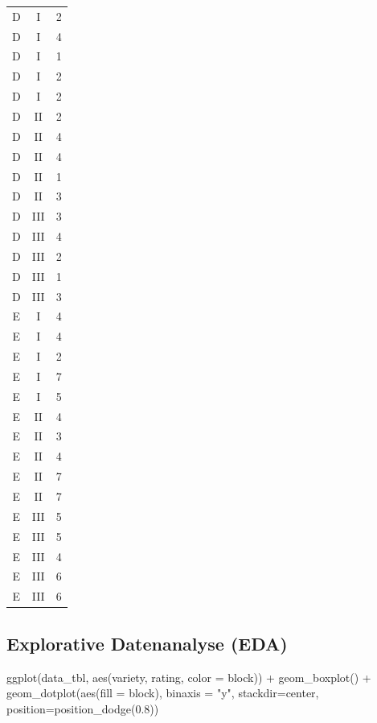 \documentclass[
  letterpaper,
  DIV=11,
  oneside]{scrreport}
\newenvironment{Shaded}{\begin{snugshade}}{\end{snugshade}}
\newcommand{\AttributeTok}[1]{\textcolor[rgb]{0.40,0.45,0.13}{#1}}
\newcommand{\FloatTok}[1]{\textcolor[rgb]{0.68,0.00,0.00}{#1}}
\newcommand{\FunctionTok}[1]{\textcolor[rgb]{0.28,0.35,0.67}{#1}}
\newcommand{\NormalTok}[1]{\textcolor[rgb]{0.00,0.23,0.31}{#1}}
\newcommand{\SpecialCharTok}[1]{\textcolor[rgb]{0.37,0.37,0.37}{#1}}
\newcommand{\StringTok}[1]{\textcolor[rgb]{0.13,0.47,0.30}{#1}}
\begin{document}
\begin{longtable}[]{@{}ccc@{}}
D & I & 2 \\
D & I & 4 \\
D & I & 1 \\
D & I & 2 \\
D & I & 2 \\
D & II & 2 \\
D & II & 4 \\
D & II & 4 \\
D & II & 1 \\
D & II & 3 \\
D & III & 3 \\
D & III & 4 \\
D & III & 2 \\
D & III & 1 \\
D & III & 3 \\
E & I & 4 \\
E & I & 4 \\
E & I & 2 \\
E & I & 7 \\
E & I & 5 \\
E & II & 4 \\
E & II & 3 \\
E & II & 4 \\
E & II & 7 \\
E & II & 7 \\
E & III & 5 \\
E & III & 5 \\
E & III & 4 \\
E & III & 6 \\
E & III & 6 \\
\bottomrule()
\end{longtable}

\hypertarget{explorative-datenanalyse-eda-1}{%
\subsection{Explorative Datenanalyse
(EDA)}\label{explorative-datenanalyse-eda-1}}

\begin{Shaded}
\begin{Highlighting}[]
\FunctionTok{ggplot}\NormalTok{(data\_tbl, }\FunctionTok{aes}\NormalTok{(variety, rating, }\AttributeTok{color =}\NormalTok{ block)) }\SpecialCharTok{+}
  \FunctionTok{geom\_boxplot}\NormalTok{() }\SpecialCharTok{+}
  \FunctionTok{geom\_dotplot}\NormalTok{(}\FunctionTok{aes}\NormalTok{(}\AttributeTok{fill =}\NormalTok{ block), }\AttributeTok{binaxis =} \StringTok{"y"}\NormalTok{, }\AttributeTok{stackdir=}\StringTok{\textquotesingle{}center\textquotesingle{}}\NormalTok{, }
               \AttributeTok{position=}\FunctionTok{position\_dodge}\NormalTok{(}\FloatTok{0.8}\NormalTok{))  }
\end{Highlighting}
\end{Shaded}
\end{document}
